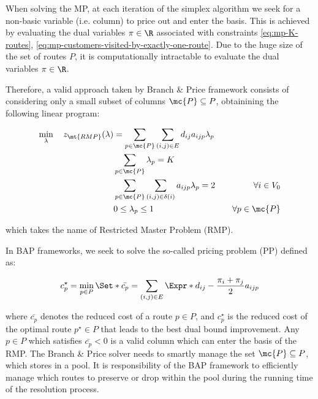 When solving the MP, at each iteration of the simplex algorithm we seek for a non-basic variable (i.e. column) to price out and enter the basis.
This is achieved by evaluating the dual variables $\pi \in \R$ associated with constraints \eqref{eq:mp-K-routes}, \eqref{eq:mp-customers-visited-by-exactly-one-route}.
Due to the huge size of the set of routes $P$, it is computationally intractable to evaluate the dual variables $\pi \in \R$.

\medskip

Therefore, a valid approach taken by Branch \& Price framework consists of considering only a small subset of columns $\mc{P} \subseteq P$, obtainining the following linear program:

\begin{align}
	\min_{\lambda} \quad z_\mt{RMP}(\lambda) & = \sum_{p \in \mc{P}} \sum_{(i, j) \in E} d_{ij} a_{ijp} \lambda_p \label{eq:rmp-obj-func}                                                                                                                              \\
	                                         & \sum_{p \in \mc{P}} \lambda_{p} = K                                                        & \label{eq:rmp-K-routes}                                                                                                    \\
	                                         & \sum_{p \in \mc{P}} \sum_{(i, j) \in \delta(i)} a_{ijp} \lambda_p = 2                      & \quad \forall i \in V_0                                              \label{eq:rmp-customers-visited-by-exactly-one-route} \\
	                                         & 0 \le \lambda_p \le 1                                                                      & \quad \forall p \in \mc{P} \label{eq:rmp-lambda-mip-var-bounds}
\end{align}

which takes the name of Restricted Master Problem (RMP).

In BAP frameworks, we seek to solve the so-called pricing problem (PP) defined as:

\begin{equation}
	{c^\star_p} = \min_{p \in P} \Set*{ \bar{c_p} = \sum_{(i, j) \in E} \Expr*{d_{ij} - \frac{\pi_i + \pi_j}{2}} a_{ijp}  }
\end{equation}

where $\bar{c_p}$ denotes the reduced cost of a route $p \in P$, and $c^\star_p$ is the reduced cost of the optimal route $p^\star \in P$ that leads to the best dual bound improvement.
Any $p \in P$ which satisfies $\bar{c_p} < 0$ is a valid column which can enter the basis of the RMP.
The Branch \& Price solver needs to smartly manage the set $\mc{P} \subseteq P$, which stores in a pool.
It is responsibility of the BAP framework to efficiently manage which routes to preserve or drop within the pool during the running time of the resolution process.

